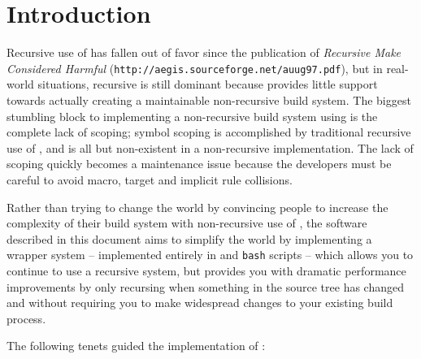 %
%
%
%
\chapter{Introduction}

Recursive use of \make has fallen out of favor since the publication
of \emph{Recursive Make Considered Harmful}
(\texttt{http://aegis.sourceforge.net/auug97.pdf}), but in real-world
situations, recursive \make is still dominant because \make provides
little support towards actually creating a maintainable non-recursive
build system.  The biggest stumbling block to implementing a
non-recursive build system using \make is the complete lack of
scoping; symbol scoping is accomplished by traditional recursive use
of \make, and is all but non-existent in a non-recursive
implementation.  The lack of scoping quickly becomes a maintenance
issue because the \makefile developers must be careful to avoid macro,
target and implicit rule collisions.

Rather than trying to change the world by convincing people to
increase the complexity of their build system with non-recursive use
of \make, the software described in this document aims to simplify the
world by implementing a wrapper system -- implemented entirely in
\gnumake and \texttt{bash} scripts -- which allows you to continue to
use a recursive \make system, but provides you with dramatic
performance improvements by only recursing when something in the
source tree has changed and without requiring you to make widespread
changes to your existing build process.

The following tenets guided the implementation of \lmsbw:

